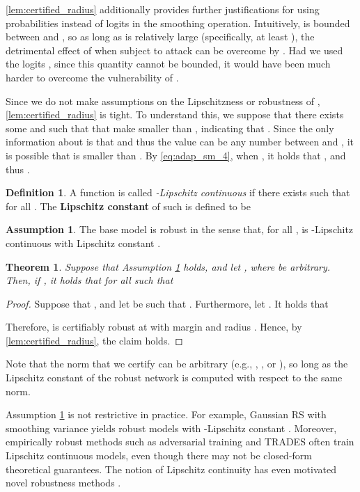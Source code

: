 \documentclass[11pt, letterpaper]{article}
\theoremstyle{plain}
\newtheorem{theorem}{Theorem}
\theoremstyle{definition}
\newtheorem{definition}{Definition}
\newtheorem{assumption}{Assumption}
\begin{document}
\cref{lem:certified_radius} additionally provides further justifications for using probabilities instead of logits in the smoothing operation. Intuitively,  is bounded between  and , so as long as  is relatively large (specifically, at least ), the detrimental effect of  when subject to attack can be overcome by . Had we used the logits , since this quantity cannot be bounded, it would have been much harder to overcome the vulnerability of .

Since we do not make assumptions on the Lipschitzness or robustness of , \cref{lem:certified_radius} is tight. To understand this, we suppose that there exists some  and  such that  that make  smaller than , indicating that . Since the only information about  is that  and thus the value  can be any number between  and , it is possible that  is smaller than . By \cref{eq:adap_sm_4}, when , it holds that , and thus .

\begin{definition}
	\label{def:lipschitz}
	A function  is called \emph{-Lipschitz continuous} if there exists  such that  for all . The \textbf{Lipschitz constant} of such  is defined to be 
	
\end{definition}

\begin{assumption}
	\label{as:lipschitz}
	The base model  is robust in the sense that, for all ,  is -Lipschitz continuous with Lipschitz constant .
\end{assumption}

\begin{theorem}
	\label{thm:certified_radius}
	Suppose that Assumption \ref{as:lipschitz} holds, and let , where  be arbitrary. Then, if , it holds that  for all  such that
	
\end{theorem}

\begin{proof}
	Suppose that , and let  be such that . Furthermore, let . It holds that
	
	Therefore,  is certifiably robust at  with margin  and radius . Hence, by \cref{lem:certified_radius}, the claim holds.
\end{proof}

Note that the  norm that we certify can be arbitrary (e.g., , , or ), so long as the Lipschitz constant of the robust network  is computed with respect to the same norm.

Assumption \ref{as:lipschitz} is not restrictive in practice. For example, Gaussian RS with smoothing variance  yields robust models with -Lipschitz constant  \cite{Salman19}. Moreover, empirically robust methods such as adversarial training and TRADES often train Lipschitz continuous models, even though there may not be closed-form theoretical guarantees. The notion of Lipschitz continuity has even motivated novel robustness methods \citep{Moosavi-Dezfooli19, Terjek20}.
\end{document}
